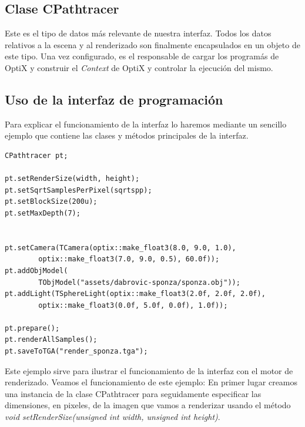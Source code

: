 \subsection{Clase CPathtracer}

Este es el tipo de datos más relevante de nuestra interfaz. Todos los datos relativos a la escena y al renderizado son finalmente encapsulados en un objeto de este tipo. Una vez configurado, es el responsable de cargar los programás de OptiX y construir el \emph{Context} de OptiX y controlar la ejecución del mismo.

\subsection{Uso de la interfaz de programación}

Para explicar el funcionamiento de la interfaz lo haremos mediante un sencillo ejemplo que contiene las clases y métodos principales de la interfaz.




\lstset{style=customc}

\begin{lstlisting}
CPathtracer pt;

pt.setRenderSize(width, height);
pt.setSqrtSamplesPerPixel(sqrtspp);
pt.setBlockSize(200u);
pt.setMaxDepth(7);


pt.setCamera(TCamera(optix::make_float3(8.0, 9.0, 1.0), 
		optix::make_float3(7.0, 9.0, 0.5), 60.0f));
pt.addObjModel(
		TObjModel("assets/dabrovic-sponza/sponza.obj"));
pt.addLight(TSphereLight(optix::make_float3(2.0f, 2.0f, 2.0f),
		optix::make_float3(0.0f, 5.0f, 0.0f), 1.0f));

pt.prepare();
pt.renderAllSamples();
pt.saveToTGA("render_sponza.tga");
\end{lstlisting}

Este ejemplo sirve para ilustrar el funcionamiento de la interfaz con el motor de renderizado.
Veamos el funcionamiento de este ejemplo:
En primer lugar creamos una instancia de la clase CPathtracer para seguidamente especificar las dimensiones, en pixeles, de la imagen que vamos a renderizar usando el método \emph{void setRenderSize(unsigned int width, unsigned int height)}. 

